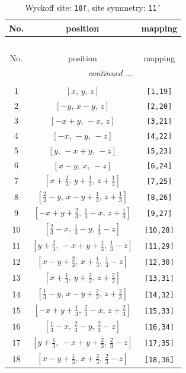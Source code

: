 \documentclass[fleqn,8pt]{jsarticle}
\begin{document}
\begin{longtable}{ccc}
\caption{Wyckoff site: {\tt 18f}, site symmetry: {\tt 11'}}
 \\
 \hline \hline
No. & position & mapping \\ \hline \endfirsthead

\multicolumn{2}{l}{\tablename\ \thetable{}} \\
 \hline \hline
No. & position & mapping \\ \hline \endhead

 \hline \hline
\multicolumn{2}{r}{\footnotesize\it continued ...} \\ \endfoot

 \hline \hline
\multicolumn{2}{r}{} \\ \endlastfoot

1 & $\left[ x,\, y,\, z \right]$ & {\tt [1,19]} \\ \hline
2 & $\left[ - y,\, x - y,\, z \right]$ & {\tt [2,20]} \\ \hline
3 & $\left[ - x + y,\, - x,\, z \right]$ & {\tt [3,21]} \\ \hline
4 & $\left[ - x,\, - y,\, - z \right]$ & {\tt [4,22]} \\ \hline
5 & $\left[ y,\, - x + y,\, - z \right]$ & {\tt [5,23]} \\ \hline
6 & $\left[ x - y,\, x,\, - z \right]$ & {\tt [6,24]} \\ \hline
7 & $\left[ x + \frac{2}{3},\, y + \frac{1}{3},\, z + \frac{1}{3} \right]$ & {\tt [7,25]} \\ \hline
8 & $\left[ \frac{2}{3} - y,\, x - y + \frac{1}{3},\, z + \frac{1}{3} \right]$ & {\tt [8,26]} \\ \hline
9 & $\left[ - x + y + \frac{2}{3},\, \frac{1}{3} - x,\, z + \frac{1}{3} \right]$ & {\tt [9,27]} \\ \hline
10 & $\left[ \frac{2}{3} - x,\, \frac{1}{3} - y,\, \frac{1}{3} - z \right]$ & {\tt [10,28]} \\ \hline
11 & $\left[ y + \frac{2}{3},\, - x + y + \frac{1}{3},\, \frac{1}{3} - z \right]$ & {\tt [11,29]} \\ \hline
12 & $\left[ x - y + \frac{2}{3},\, x + \frac{1}{3},\, \frac{1}{3} - z \right]$ & {\tt [12,30]} \\ \hline
13 & $\left[ x + \frac{1}{3},\, y + \frac{2}{3},\, z + \frac{2}{3} \right]$ & {\tt [13,31]} \\ \hline
14 & $\left[ \frac{1}{3} - y,\, x - y + \frac{2}{3},\, z + \frac{2}{3} \right]$ & {\tt [14,32]} \\ \hline
15 & $\left[ - x + y + \frac{1}{3},\, \frac{2}{3} - x,\, z + \frac{2}{3} \right]$ & {\tt [15,33]} \\ \hline
16 & $\left[ \frac{1}{3} - x,\, \frac{2}{3} - y,\, \frac{2}{3} - z \right]$ & {\tt [16,34]} \\ \hline
17 & $\left[ y + \frac{1}{3},\, - x + y + \frac{2}{3},\, \frac{2}{3} - z \right]$ & {\tt [17,35]} \\ \hline
18 & $\left[ x - y + \frac{1}{3},\, x + \frac{2}{3},\, \frac{2}{3} - z \right]$ & {\tt [18,36]} \\
\end{longtable}
\end{document}

